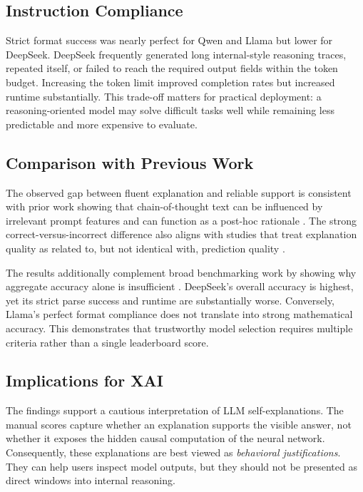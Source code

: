 \documentclass{article}
\begin{document}
\subsection{Instruction Compliance}

Strict format success was nearly perfect for Qwen and Llama but lower for DeepSeek. DeepSeek frequently generated long internal-style reasoning traces, repeated itself, or failed to reach the required output fields within the token budget. Increasing the token limit improved completion rates but increased runtime substantially. This trade-off matters for practical deployment: a reasoning-oriented model may solve difficult tasks well while remaining less predictable and more expensive to evaluate.

\subsection{Comparison with Previous Work}

The observed gap between fluent explanation and reliable support is consistent with prior work showing that chain-of-thought text can be influenced by irrelevant prompt features and can function as a post-hoc rationale \cite{turpin2023language,lanham2023measuring}. The strong correct-versus-incorrect difference also aligns with studies that treat explanation quality as related to, but not identical with, prediction quality \cite{madsen2024selfexplanations,paul2024making}.

The results additionally complement broad benchmarking work by showing why aggregate accuracy alone is insufficient \cite{liang2023helm}. DeepSeek's overall accuracy is highest, yet its strict parse success and runtime are substantially worse. Conversely, Llama's perfect format compliance does not translate into strong mathematical accuracy. This demonstrates that trustworthy model selection requires multiple criteria rather than a single leaderboard score.

\subsection{Implications for XAI}

The findings support a cautious interpretation of LLM self-explanations. The manual scores capture whether an explanation supports the visible answer, not whether it exposes the hidden causal computation of the neural network. Consequently, these explanations are best viewed as \emph{behavioral justifications}. They can help users inspect model outputs, but they should not be presented as direct windows into internal reasoning.
\end{document}
